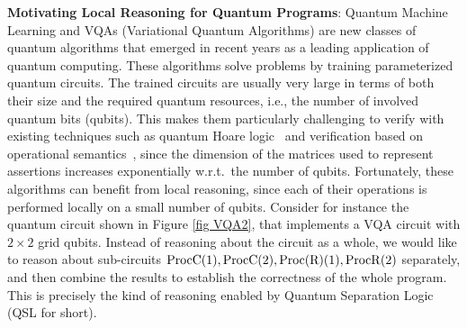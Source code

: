 \documentclass[conference,compsoc, 10pt]{IEEEtran}
\newcommand{\gb}[1]{\textit{\color{green}[GB] : #1}}
\newcommand{\jh}[1]{\textit{\color{red}[JH] : #1}}
\newcommand{\lz}[1]{\textit{\color{blue}[LZ] : #1}}
\newcommand{\ny}[1]{\textit{\color{blue}[NY] : #1}}
\begin{document}
	\textbf{Motivating Local Reasoning for Quantum Programs}:
        Quantum Machine Learning \cite{BWP17, BVM20} and VQAs
(Variational Quantum Algorithms) \cite{PMS14,MRB16} are new classes of quantum algorithms that emerged in recent years as a leading application of quantum computing. These algorithms solve problems by training parameterized quantum circuits. The trained circuits are usually very large
        in terms of both their size and
        the required quantum resources, i.e., the number of involved quantum bits   (qubits). 
        This makes them particularly challenging to verify
        with existing techniques such as quantum Hoare logic~\cite{Ying11,ZYY19} and verification based on operational semantics~\cite{HRS20}, since the dimension of  the matrices used to represent assertions   increases
        exponentially w.r.t.\, the number of qubits.
        Fortunately, these algorithms can benefit from local reasoning,  since each of their operations is performed locally on a  small number of qubits. Consider for instance the quantum circuit shown in
        Figure \ref{fig VQA2}, that implements a VQA circuit with
        $2 \times 2$ grid qubits. Instead of reasoning about the
circuit as a whole, we would like to reason about sub-circuits
        ${\rm ProcC}(1), {\rm ProcC}(2), {\rm Proc(R)}(1), {\rm
          ProcR}(2)$ separately, and then combine the results 
        to establish the correctness of the whole program. This is
        precisely the kind of reasoning enabled by Quantum Separation Logic (QSL for short).

     
	
\end{document}
